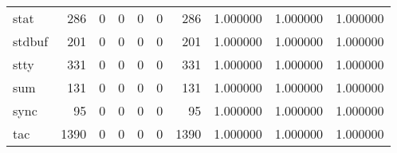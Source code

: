 \begin{longtable}{lrrrrrrrrr}
stat      &                                                286 &                                                  0 &                                                  0 &                                                  0 &                                                  0 &                                                286 &                                           1.000000 &                               1.000000 &                             1.000000 \\
stdbuf    &                                                201 &                                                  0 &                                                  0 &                                                  0 &                                                  0 &                                                201 &                                           1.000000 &                               1.000000 &                             1.000000 \\
stty      &                                                331 &                                                  0 &                                                  0 &                                                  0 &                                                  0 &                                                331 &                                           1.000000 &                               1.000000 &                             1.000000 \\
sum       &                                                131 &                                                  0 &                                                  0 &                                                  0 &                                                  0 &                                                131 &                                           1.000000 &                               1.000000 &                             1.000000 \\
sync      &                                                 95 &                                                  0 &                                                  0 &                                                  0 &                                                  0 &                                                 95 &                                           1.000000 &                               1.000000 &                             1.000000 \\
tac       &                                               1390 &                                                  0 &                                                  0 &                                                  0 &                                                  0 &                                               1390 &                                           1.000000 &                               1.000000 &                             1.000000 \\

\end{longtable}
